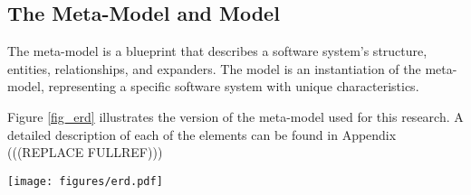 \subsection{The Meta-Model and Model} \label{sec_artifact_meta_model}

The meta-model is a blueprint that describes a software system's structure, entities,
relationships, and expanders. The model is an instantiation of the meta-model,
representing a specific software system with unique characteristics. 

Figure \ref{fig_erd} illustrates the version of the meta-model used for this research. A
detailed description of each of the elements can be found in Appendix
(((REPLACE FULLREF)))

\begin{figure*}[ht!]
    \centering
    \centerline{\texttt{[image: figures/erd.pdf]}}
    \caption[The meta-model represented as an Entity Relationship Diagram]{The meta-model represented as an Entity Relationship Diagram}
    \label{fig_erd}
\end{figure*}